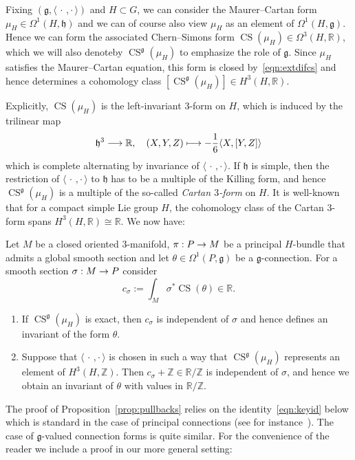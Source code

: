 \documentclass[AHL,Unicode,longabstracts]{cedram}
\newcommand{\si}{\sigma}
\newcommand{\Om}{\Omega}
\newcommand{\B}[2]{\langle#1,#2\rangle}
\DeclareMathOperator{\CS}{CS}
\newcommand*{\R}{\mathbb{R}}
\newcommand{\Z}{\mathbb{Z}}
\newcommand{\fkg}{\mathfrak{g}}
\newcommand{\fkh}{\mathfrak{h}}
\renewcommand*{\to}{\mathchoice{\longrightarrow}{\rightarrow}{\rightarrow}{\rightarrow}}
\let\oldmapsto\mapsto
\renewcommand*{\mapsto}{\mathchoice{\longmapsto}{\oldmapsto}{\oldmapsto}{\oldmapsto}}
\newcommand*{\relabel}{\renewcommand{\labelenumi}{(\theenumi)}}
\newcommand*{\romanenumi}{\renewcommand*{\theenumi}{\roman{enumi}}\relabel}
\newcommand*{\R}{\mathbb{R}}
\begin{document}
Fixing $(\fkg,\B{\,\cdot\,}{\cdot\,})$ and $H\!\!\subset\! G$, we can consider the Maurer--Cartan form ${\mu_H\!\in\!\Om^1(H,\fkh)}$ and we can of course also view $\mu_H$ as an element of $\Om^1(H,\fkg)$. Hence we can form the associated Chern--Simons form $\CS(\mu_H)\in\Om^3(H,\R)$, which we will also denote\linebreak by $\CS^{\fkg}(\mu_H)$ to emphasize the role of $\fkg$. Since $\mu_H$ satisfies the Maurer--Cartan equation, this form is closed by~\eqref{eqn:extdifcs} and hence determines a cohomology class $[\CS^{\fkg}(\mu_H)]\in H^3(H,\R)$.

Explicitly, $\CS(\mu_H)$ is the left-invariant $3$-form on $H$, which is induced by the trilinear map
\[
\fkh^3\to\R, \quad (X,Y,Z)\mapsto -\frac16\B{X}{[Y,Z]}
\]
which is complete alternating by invariance of $\B{\,\cdot\,}{\cdot\,}$. If $\fkh$ is simple, then the restriction of $\B{\,\cdot\,}{\cdot\,}$ to $\fkh$ has to be a multiple of the Killing form, and hence $\CS^{\fkg}(\mu_H)$ is a multiple of the so-called
\emph{Cartan $3$-form} on $H$. It is well-known that for a compact simple Lie group $H$, the cohomology class of the Cartan $3$-form spans $H^3(H,\R)\cong\R$. We now have:

\goodbreak
\begin{prop}\label{prop:pullbacks}
Let $M$ be a closed oriented $3$-manifold, $\pi : P \to M$ be a principal $H$-bundle that admits a global smooth section and let $\theta\in\Om^1(P,\fkg)$ be a $\fkg$-connection. For a smooth section $\si: M\to P$ consider
\[
c_\si:=\int_M \si^*\CS(\theta)\in\R.
\]
\begin{enumerate}\romanenumi
\item\label{prop3.3.1} If $\CS^{\fkg}(\mu_H)$ is exact, then $c_\si$ is independent of $\si$ and hence defines an invariant of the form $\theta$.

\item\label{prop3.3.2} Suppose that $\B{\,\cdot\,}{\cdot\,}$ is chosen in such a way that $\CS^\fkg(\mu_H)$ represents an element of $H^3(H,\Z)$. Then $c_\si+\Z\in\R/\Z$ is independent of $\si$, and hence we obtain an invariant of $\theta$ with values in $\R/\Z$.
\end{enumerate}
\end{prop}

The proof of Proposition~\ref{prop:pullbacks} relies on the identity~\eqref{eqn:keyid} below which is standard in the case of principal connections (see for instance~\cite{MR1337109}). The case of $\fkg$-valued connection forms is quite similar. For the convenience of the reader we include a proof in our more general setting:
\end{document}
